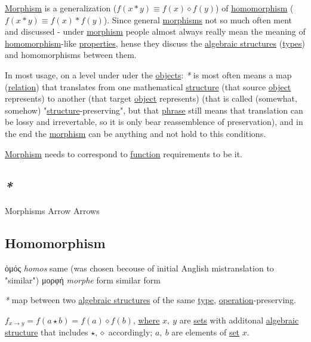 \documentclass[a4paper,14pt,oneside]{book}
\begin{document}
\hyperref[org60b7530]{Morphism} is a generalization (\(f(x*y) \equiv f(x) \diamond f(y)\)) of \hyperref[org037eca6]{homomorphism} (\(f(x*y) \equiv f(x) * f(y)\)).
Since general \hyperref[org46b4110]{morphisms} not so much often ment and discussed - under \hyperref[org60b7530]{morphism} people almost always really mean the meaning of \hyperref[org037eca6]{homomorphism}-like \hyperref[orgff8ecf0]{properties}, hense they discuss the \hyperref[org1a9b931]{algebraic structures} (\hyperref[orge9a3a14]{types}) and homomorphisms between them.

In most usage, on a level under uder the \hyperref[orgde02dc0]{objects}: \emph{*} is most often means a map (\hyperref[org36115b6]{relation}) that translates from one mathematical \hyperref[org2f3ef45]{structure} (that source \hyperref[orged022cb]{object} represents) to another (that target \hyperref[orged022cb]{object} represents) (that is called (somewhat, somehow) "\hyperref[org2f3ef45]{structure}-preserving", but that \hyperref[org948b745]{phrase} still means that translation can be lossy and irrevertable, so it is only bear reassemblence of preservation), and in the end the \hyperref[org60b7530]{morphism} can be anything and not hold to this conditions.

\hyperref[org60b7530]{Morphism} needs to correspond to \hyperref[org679af45]{function} requirements to be it.

\subsection{\emph{*}}
\label{sec:org9cc4701}

\label{org46b4110}Morphisms
\label{org74f3926}Arrow
\label{orgafe2ba3}Arrows

\subsection{\label{org037eca6}Homomorphism}
\label{sec:orgead4e62}
ὁμός \emph{homos} same (was chosen becouse of initial Anglish mistranslation to "similar")
μορφή \emph{morphe} form
similar form

\emph{*} map between two \hyperref[org1a9b931]{algebraic structures} of the same \hyperref[org1eff537]{type}, \hyperref[orgf147542]{operation}-preserving.

\(f_{x \to y} = f(a \star b) = f(a) \diamond f(b)\),
\hyperref[org6c63c7a]{where} \(x,\ y\) are \hyperref[orgfcb3af7]{sets} with additonal \hyperref[org15a095b]{algebraic structure} that includes \(\star, \diamond\) accordingly; \(a,\ b\) are elements of \hyperref[org128a409]{set} \(x\).
\end{document}
